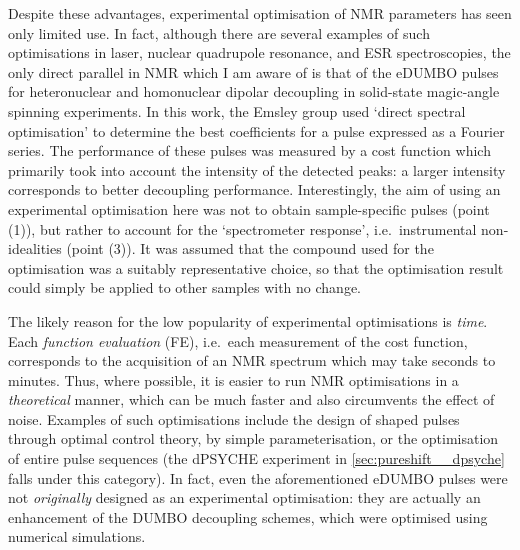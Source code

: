 Despite these advantages, experimental optimisation of NMR parameters has seen only limited use.
In fact, although there are several examples of such optimisations in laser\autocite{Bardeen1997CPL}, nuclear quadrupole resonance\autocite{Schiano1999JMR,Schiano2000ZNA,Monea2020JMR}, and ESR\autocite{Goodwin2018JMR} spectroscopies, 
the only direct parallel in NMR which I am aware of is that of the eDUMBO pulses for heteronuclear\autocite{DePaepe2003CPL,Elena2004CPL} and homonuclear dipolar\autocite{Salager2010CPL} decoupling in solid-state magic-angle spinning experiments.
In this work, the Emsley group used `direct spectral optimisation' to determine the best coefficients for a pulse expressed as a Fourier series.
The performance of these pulses was measured by a cost function which primarily took into account the intensity of the detected peaks: a larger intensity corresponds to better decoupling performance.
Interestingly, the aim of using an experimental optimisation here was not to obtain sample-specific pulses (point (1)), but rather to account for the `spectrometer response', i.e.\ instrumental non-idealities (point (3)).
It was assumed that the compound used for the optimisation was a suitably representative choice, so that the optimisation result could simply be applied to other samples with no change.

The likely reason for the low popularity of experimental optimisations is \textit{time}.
Each \textit{function evaluation} (FE), i.e.\ each measurement of the cost function, corresponds to the acquisition of an NMR spectrum which may take seconds to minutes.
Thus, where possible, it is easier to run NMR optimisations in a \textit{theoretical} manner, which can be much faster and also circumvents the effect of noise.
Examples of such optimisations include the design of shaped pulses through optimal control theory\autocite{Skinner2003JMR,Kobzar2004JMR,Khaneja2005JMR,Kobzar2008JMR,Kobzar2012JMR,Schilling2014ACIE,Glaser2015EPJD}, by simple parameterisation\autocite{Geen1989JMR,Emsley1990CPL,Geen1991JMR,Nuzillard1994JMRSA,Kupce1995JMRSA,Kupce1995JMRSB}, or the optimisation of entire pulse sequences\autocite{Shaka1985JMR,Freeman1987JMR,Bechmann2013JMR,Ehni2014JMR,Lapin2020JMR} (the dPSYCHE experiment in \cref{sec:pureshift__dpsyche} falls under this category).
In fact, even the aforementioned eDUMBO pulses were not \textit{originally} designed as an experimental optimisation: they are actually an enhancement of the DUMBO decoupling schemes, which were optimised using numerical simulations\autocite{Sakellariou2000CPL}.

